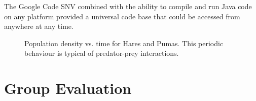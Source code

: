 \documentclass[11pt]{report}
\begin{document}
	The Google Code SNV combined with the ability to compile and run Java code on any platform provided a universal code base that could be accessed from anywhere at any time.    

   \begin{figure}[h]
   
   
   \caption{Population density vs. time for Hares and Pumas. This periodic behaviour is typical of predator-prey interactions.}
   \end{figure}

\chapter{Group Evaluation} %
\end{document}
